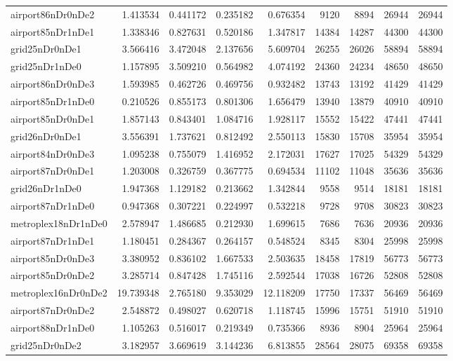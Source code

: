 \begin{longtable}{|l|r|r|r|r|r|r|r|r|}
airport86nDr0nDe2 & 1.413534 & 0.441172 & 0.235182 & 0.676354 & 9120 & 8894 & 26944 & 26944 \\
airport85nDr1nDe1 & 1.338346 & 0.827631 & 0.520186 & 1.347817 & 14384 & 14287 & 44300 & 44300 \\
grid25nDr0nDe1 & 3.566416 & 3.472048 & 2.137656 & 5.609704 & 26255 & 26026 & 58894 & 58894 \\
grid25nDr1nDe0 & 1.157895 & 3.509210 & 0.564982 & 4.074192 & 24360 & 24234 & 48650 & 48650 \\
airport86nDr0nDe3 & 1.593985 & 0.462726 & 0.469756 & 0.932482 & 13743 & 13192 & 41429 & 41429 \\
airport85nDr1nDe0 & 0.210526 & 0.855173 & 0.801306 & 1.656479 & 13940 & 13879 & 40910 & 40910 \\
airport85nDr0nDe1 & 1.857143 & 0.843401 & 1.084716 & 1.928117 & 15552 & 15422 & 47441 & 47441 \\
grid26nDr0nDe1 & 3.556391 & 1.737621 & 0.812492 & 2.550113 & 15830 & 15708 & 35954 & 35954 \\
airport84nDr0nDe3 & 1.095238 & 0.755079 & 1.416952 & 2.172031 & 17627 & 17025 & 54329 & 54329 \\
airport87nDr0nDe1 & 1.203008 & 0.326759 & 0.367775 & 0.694534 & 11102 & 11048 & 35636 & 35636 \\
grid26nDr1nDe0 & 1.947368 & 1.129182 & 0.213662 & 1.342844 & 9558 & 9514 & 18181 & 18181 \\
airport87nDr1nDe0 & 0.947368 & 0.307221 & 0.224997 & 0.532218 & 9728 & 9708 & 30823 & 30823 \\
metroplex18nDr1nDe0 & 2.578947 & 1.486685 & 0.212930 & 1.699615 & 7686 & 7636 & 20936 & 20936 \\
airport87nDr1nDe1 & 1.180451 & 0.284367 & 0.264157 & 0.548524 & 8345 & 8304 & 25998 & 25998 \\
airport85nDr0nDe3 & 3.380952 & 0.836102 & 1.667533 & 2.503635 & 18458 & 17819 & 56773 & 56773 \\
airport85nDr0nDe2 & 3.285714 & 0.847428 & 1.745116 & 2.592544 & 17038 & 16726 & 52808 & 52808 \\
metroplex16nDr0nDe2 & 19.739348 & 2.765180 & 9.353029 & 12.118209 & 17750 & 17337 & 56469 & 56469 \\
airport87nDr0nDe2 & 2.548872 & 0.498027 & 0.620718 & 1.118745 & 15996 & 15751 & 51910 & 51910 \\
airport88nDr1nDe0 & 1.105263 & 0.516017 & 0.219349 & 0.735366 & 8936 & 8904 & 25964 & 25964 \\
grid25nDr0nDe2 & 3.182957 & 3.669619 & 3.144236 & 6.813855 & 28564 & 28075 & 69358 & 69358 \\

\end{longtable}
